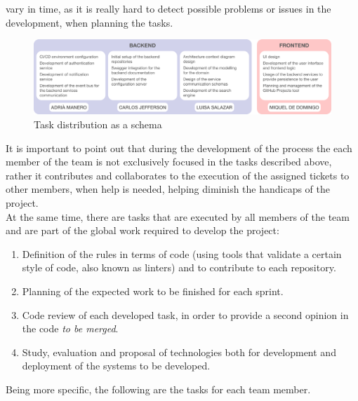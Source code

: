 \documentclass[../memory.tex]{subfiles}
\begin{document}
vary in time, as it is really hard to detect possible problems or issues in the
development, when planning the tasks.
\begin{figure}[H]
	\centering
	\includegraphics[width=\textwidth]{./assets/planning-organization.png}
	\caption{Task distribution as a schema}
\end{figure}
It is important to point out that during the development of the process the each
member of the team is not exclusively focused in the tasks described above,
rather it contributes and collaborates to the execution of the assigned tickets
to other members, when help is needed, helping diminish the handicaps of the
project.
\\
At the same time, there are tasks that are executed by all members of the team
and are part of the global work required to develop the project:
\begin{enumerate}[label = -]
	\item Definition of the rules in terms of code (using tools that validate a
	      certain style of code, also known as linters) and to contribute to each
	      repository.
	\item Planning of the expected work to be finished for each sprint.
	\item Code review of each developed task, in order to provide a second opinion
	      in the code \emph{to be merged}.
	\item Study, evaluation and proposal of technologies both for development and
	      deployment of the systems to be developed.
\end{enumerate}
Being more specific, the following are the tasks for each team member.
\end{document}
